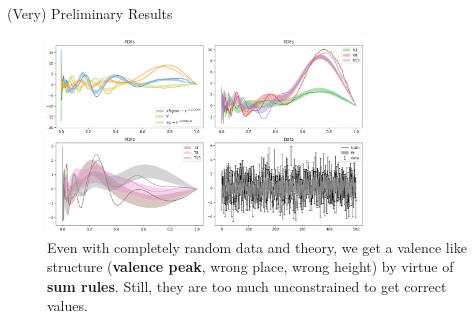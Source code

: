 \documentclass[9pt]{beamer}
\begin{document}
\begin{frame}{(Very) Preliminary Results}
    \vspace*{10pt}
    \begin{figure}
        \centering
        \includegraphics[width=0.75\textwidth]{fit-pdf}
        \caption{
            Even with completely random data and theory, we get a valence like
            structure (\textbf{valence peak}, wrong place, wrong height) by
            virtue of \textbf{sum rules}. Still, they are too much
            unconstrained to get correct values.
        }
    \end{figure}
\end{frame}
\end{document}
